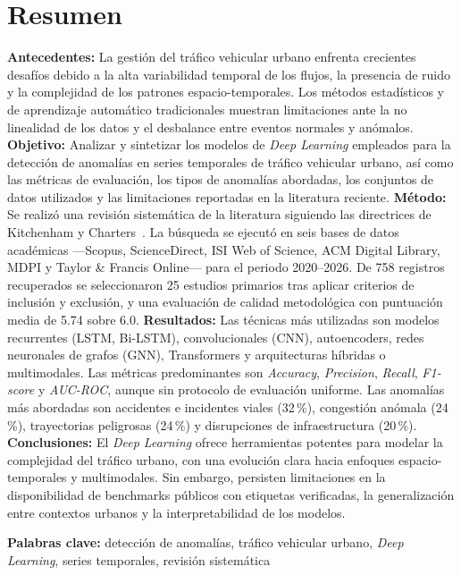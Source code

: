 \documentclass[12pt, a4paper]{article}
\begin{document}
\section*{Resumen}
\noindent
\textbf{Antecedentes:} La gesti\'{o}n del tr\'{a}fico vehicular urbano enfrenta crecientes desaf\'{i}os debido a la alta variabilidad temporal de los flujos, la presencia de ruido y la complejidad de los patrones espacio-temporales. Los m\'{e}todos estad\'{i}sticos y de aprendizaje autom\'{a}tico tradicionales muestran limitaciones ante la no linealidad de los datos y el desbalance entre eventos normales y an\'{o}malos. \textbf{Objetivo:} Analizar y sintetizar los modelos de \textit{Deep Learning} empleados para la detecci\'{o}n de anomal\'{i}as en series temporales de tr\'{a}fico vehicular urbano, as\'{i} como las m\'{e}tricas de evaluaci\'{o}n, los tipos de anomal\'{i}as abordadas, los conjuntos de datos utilizados y las limitaciones reportadas en la literatura reciente. \textbf{M\'{e}todo:} Se realiz\'{o} una revisi\'{o}n sistem\'{a}tica de la literatura siguiendo las directrices de Kitchenham y Charters~\cite{Kitchenham2007}. La b\'{u}squeda se ejecut\'{o} en seis bases de datos acad\'{e}micas ---Scopus, ScienceDirect, ISI Web of Science, ACM Digital Library, MDPI y Taylor \& Francis Online--- para el periodo 2020--2026. De 758 registros recuperados se seleccionaron 25 estudios primarios tras aplicar criterios de inclusi\'{o}n y exclusi\'{o}n, y una evaluaci\'{o}n de calidad metodol\'{o}gica con puntuaci\'{o}n media de 5.74 sobre 6.0. \textbf{Resultados:} Las t\'{e}cnicas m\'{a}s utilizadas son modelos recurrentes (LSTM, Bi-LSTM), convolucionales (CNN), autoencoders, redes neuronales de grafos (GNN), Transformers y arquitecturas h\'{i}bridas o multimodales. Las m\'{e}tricas predominantes son \textit{Accuracy}, \textit{Precision}, \textit{Recall}, \textit{F1-score} y \textit{AUC-ROC}, aunque sin protocolo de evaluaci\'{o}n uniforme. Las anomal\'{i}as m\'{a}s abordadas son accidentes e incidentes viales (32\,\%), congesti\'{o}n an\'{o}mala (24\,\%), trayectorias peligrosas (24\,\%) y disrupciones de infraestructura (20\,\%). \textbf{Conclusiones:} El \textit{Deep Learning} ofrece herramientas potentes para modelar la complejidad del tr\'{a}fico urbano, con una evoluci\'{o}n clara hacia enfoques espacio-temporales y multimodales. Sin embargo, persisten limitaciones en la disponibilidad de benchmarks p\'{u}blicos con etiquetas verificadas, la generalizaci\'{o}n entre contextos urbanos y la interpretabilidad de los modelos.

\vspace{0.4em}
\noindent\textbf{Palabras clave:} detecci\'{o}n de anomal\'{i}as, tr\'{a}fico vehicular urbano, \textit{Deep Learning}, series temporales, revisi\'{o}n sistem\'{a}tica
\end{document}
